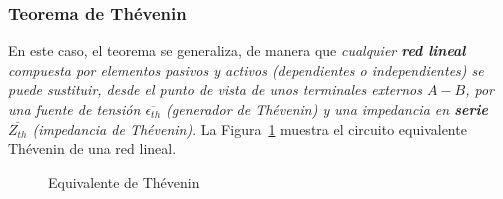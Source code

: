 \documentclass[11pt]{book} %
\begin{document}
\subsubsection{Teorema de Thévenin}
En este caso, el teorema se generaliza, de manera que \textit{cualquier \textbf{red lineal} compuesta por elementos pasivos y activos (dependientes o independientes) se puede sustituir, desde el punto de vista de unos terminales externos $A-B$, por una fuente de tensión $\overline{\epsilon_{th}}$ (generador de Thévenin) y una impedancia en \textbf{serie} $\overline{Z_{th}}$ (impedancia de Thévenin)}. La Figura~\ref{fig.thevenin_ca} muestra el circuito equivalente Thévenin de una red lineal. 
\begin{figure}[htbp]
        \centering
        \hfil
        \caption{Equivalente de Thévenin}
        \label{fig.thevenin_ca}
    \end{figure}
     
\end{document}
